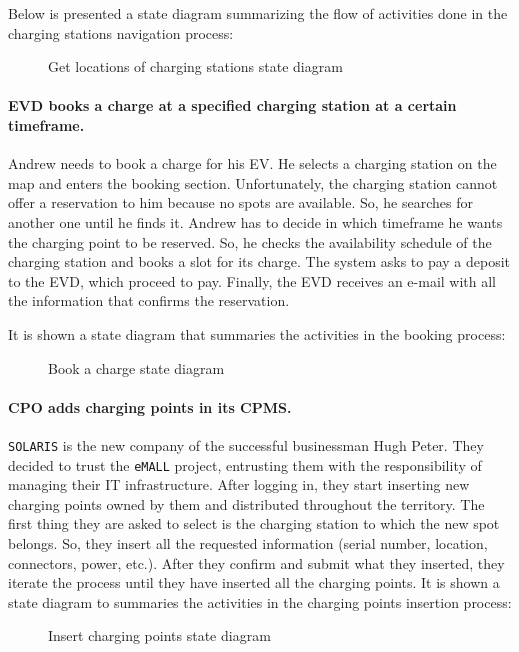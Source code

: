 Below is presented a state diagram summarizing the flow of activities done in the charging stations navigation process:
\begin{figure}[H]
    \begin{center}
        
        \caption{Get locations of charging stations state diagram}
        \label{fig:locations_sd}%
    \end{center}
\end{figure}

\paragraph{EVD books a charge at a specified charging station at a certain timeframe.}
Andrew needs to book a charge for his EV\@.
He selects a charging station on the map and enters the booking section.
Unfortunately, the charging station cannot offer a reservation to him because no spots are available.
So, he searches for another one until he finds it.
Andrew has to decide in which timeframe he wants the charging point to be reserved.
So, he checks the availability schedule of the charging station and books a slot for its charge.
The system asks to pay a deposit to the EVD, which proceed to pay.
Finally, the EVD receives an e-mail with all the information that confirms the reservation.

It is shown a state diagram that summaries the activities in the booking process:
\begin{figure}[H]
    \begin{center}
        
        \caption{Book a charge state diagram}
        \label{fig:booking_sd}%
    \end{center}
\end{figure}

\paragraph{CPO adds charging points in its CPMS.}
\verb|SOLARIS| is the new company of the successful businessman Hugh Peter.
They decided to trust the \verb|eMALL| project, entrusting them with the responsibility of managing their IT infrastructure.
After logging in, they start inserting new charging points owned by them and distributed throughout the territory.
The first thing they are asked to select is the charging station to which the new spot belongs.
So, they insert all the requested information (serial number, location, connectors, power, etc.).
After they confirm and submit what they inserted, they iterate the process until they have inserted all the charging points.
It is shown a state diagram to summaries the activities in the charging points insertion process:
\begin{figure}[H]
    \begin{center}
        
        \caption{Insert charging points state diagram}
        \label{fig:insert_charging_points_sd}%
    \end{center}
\end{figure}

